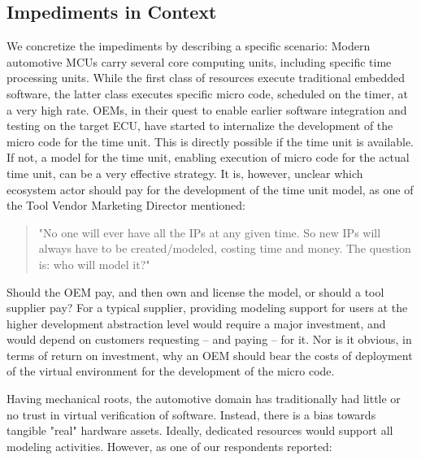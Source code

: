 \subsection{Impediments in Context}
We concretize the impediments 
by describing a specific scenario:
Modern automotive MCUs carry several core computing units, including specific time processing units.
While the first class of resources execute traditional embedded software, the latter class executes specific micro code, scheduled on the timer, at a very high rate.
OEMs, in their quest to enable earlier software integration and testing on the target ECU, have started to internalize the development of the micro code for the time unit.
This is directly possible if the time unit is available.
If not, a model for the time unit, enabling execution of micro code for the actual time unit, can be a very effective strategy.
It is, however, unclear which ecosystem actor should pay for the development of the time unit model, as one of the Tool Vendor Marketing Director mentioned: 

\begin{quote}
"No one will ever have all the IPs at any given time. So new IPs will always have to be created/modeled, costing time and money. The question is: who will model it?"
\end{quote}

Should the OEM pay, and then own and license the model, or should a tool supplier pay?
For a typical supplier, providing modeling support for users at the higher development abstraction level would require a major investment, and would depend on customers requesting -- and paying -- for it.
Nor is it obvious, in terms of return on investment, why an OEM should bear the costs of deployment of the virtual environment for the development of the micro code.


Having mechanical roots, the automotive domain has traditionally had little or no trust in virtual verification of software.
Instead, there is a bias towards tangible "real" hardware assets.
Ideally, dedicated resources would support all modeling activities.
However, as one of our respondents reported:

